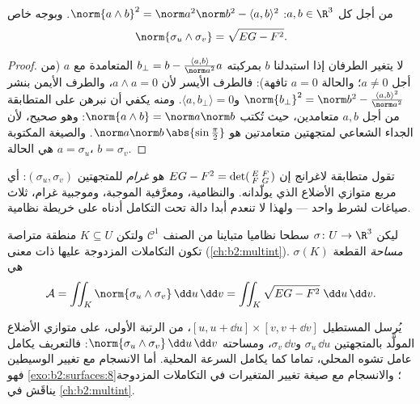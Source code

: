 \begin{lemma}\label{lem:b2:surfaces:lagrange}
من أجل كل $a, b \in \R^3$: $\norm{a \wedge b}^2 = \norm a^2 \norm b^2 - \langle a, b\rangle^2$.
وبوجه خاص
\[
\norm{\sigma_u \wedge \sigma_v} = \sqrt{EG - F^2}.
\]
\end{lemma}

\begin{proof}
لا يتغير الطرفان إذا استبدلنا $b$ بمركبته $b_\perp
= b - \frac{\langle a, b\rangle}{\norm a^2}a$ المتعامدة مع
$a$ (من أجل $a \neq 0$؛ والحالة $a = 0$ تافهة): فالطرف الأيسر لأن
$a \wedge a = 0$، والطرف الأيمن بنشر $\norm
{b_\perp}^2 = \norm b^2 - \frac{\langle a,b\rangle^2}{\norm a^2}$ و$\langle a, b_\perp\rangle = 0$. ومنه يكفي أن نبرهن على
المتطابقة من أجل $a, b$ متعامدين، حيث تُكتب $\norm{a \wedge
b} = \norm a \norm b$: وهو صحيح، لأن
 الجداء الشعاعي لمتجهتين متعامدتين هو $\norm a\norm b\,\abs{\sin\frac\pi2}$. والصيغة المكتوبة
هي الحالة $a = \sigma_u$، $b = \sigma_v$.
\end{proof}

\begin{remark}
تقول متطابقة لاغرانج إن $EG - F^2 = \det\begin{psmallmatrix}
E & F\\ F & G\end{psmallmatrix}$ هو \emph{ غرام} للمتجهتين $(\sigma_u, \sigma_v)$:
أي مربع  متوازي الأضلاع الذي يولّدانه. والنظامية، ومعرَّفية
 الموجبة، وموجبية  غرام، ثلاث صياغات لشرط
واحد --- ولهذا لا تنعدم أبدا دالة  تحت التكامل أدناه على
خريطة نظامية.
\end{remark}

\begin{definition}[المساحة]\label{def:b2:surfaces:area}
ليكن $\sigma \colon U \to \R^3$ سطحا نظاميا متباينا من الصنف $\mathcal{C}^1$ ولتكن $K \subseteq U$
منطقة متراصة تكون التكاملات المزدوجة عليها ذات معنى (\cref{ch:b2:multint}).
\emph{مساحة} القطعة $\sigma(K)$ هي
\[
\mathcal{A}
= \iint_K \norm{\sigma_u \wedge \sigma_v}\,\dd u\,\dd v
= \iint_K \sqrt{EG - F^2}\;\dd u\,\dd v .
\]
\end{definition}

\begin{remark}
يُرسل المستطيل $[u, u + \dd u] \times [v, v + \dd v]$، من الرتبة الأولى، على متوازي الأضلاع المولَّد
بالمتجهتين $\sigma_u\,\dd u$ و$\sigma_v\,\dd v$، ومساحته $\norm{\sigma_u \wedge
\sigma_v}\,\dd u\,\dd v$: فالتعريف يكامل عامل تشوه
 المحلي، تماما كما يكامل  السرعة المحلية. أما
الانسجام مع تغيير الوسيطين فهو \cref{exo:b2:surfaces:8}؛ والانسجام مع صيغة تغيير
المتغيرات في التكاملات المزدوجة يناقَش في \cref{ch:b2:multint}.
\end{remark}


